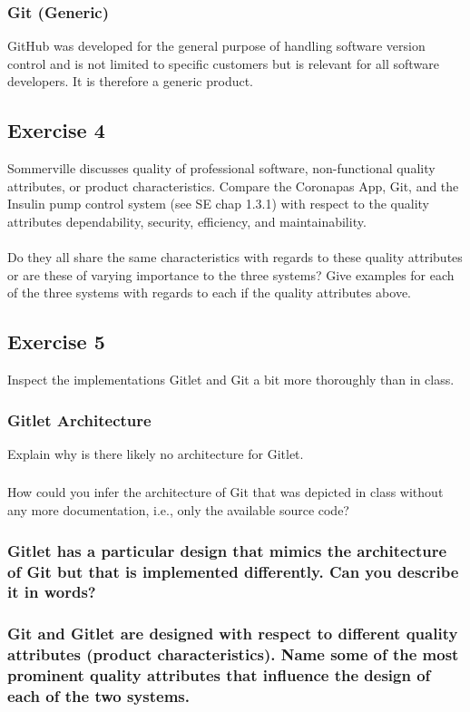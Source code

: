 \documentclass{article}
\begin{document}
\subsubsection*{Git (Generic)}
GitHub was developed for the general purpose of handling software version control and is not limited to specific customers but is relevant for all software developers. It is therefore a generic product. 

\subsection*{Exercise 4}
Sommerville discusses quality of professional software, non-functional quality attributes, or product characteristics. Compare the Coronapas App, Git, and the Insulin pump control system (see SE chap 1.3.1) with respect to the quality attributes dependability, security, efficiency, and maintainability.
\\\\
Do they all share the same characteristics with regards to these quality attributes or are these of varying importance to the three systems? Give examples for each of the three systems with regards to each if the quality attributes above.

\subsection*{Exercise 5}
Inspect the implementations Gitlet and Git a bit more thoroughly than in class.
\subsubsection*{Gitlet Architecture}
Explain why is there likely no architecture for Gitlet.
\subsubsection*{}
How could you infer the architecture of Git that was depicted in class without any more documentation, i.e., only the available source code?
\subsubsection*{Gitlet has a particular design that mimics the architecture of Git but that is implemented differently. Can you describe it in words?}
\subsubsection*{Git and Gitlet are designed with respect to different quality attributes (product characteristics). Name some of the most prominent quality attributes that influence the design of each of the two systems.}
\end{document}
